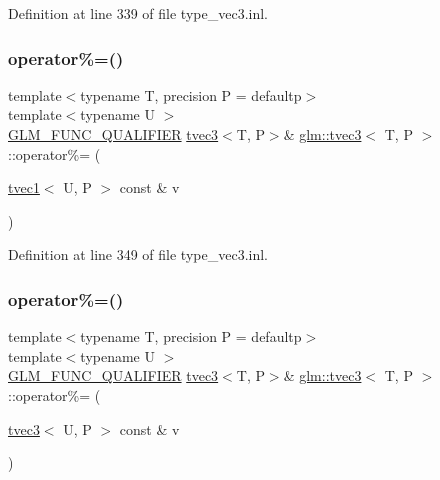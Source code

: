Definition at line 339 of file type\+\_\+vec3.\+inl.

\mbox{\label{structglm_1_1tvec3_aea61db59d6e74810ebdd814c44d0c7d2}} 
\subsubsection{\texorpdfstring{operator\%=()}{operator\%=()}\hspace{0.1cm}{\footnotesize\ttfamily [5/6]}}
{\footnotesize\ttfamily template$<$typename T, precision P = defaultp$>$ \\
template$<$typename U $>$ \\
\mbox{\hyperlink{setup_8hpp_a33fdea6f91c5f834105f7415e2a64407}{G\+L\+M\+\_\+\+F\+U\+N\+C\+\_\+\+Q\+U\+A\+L\+I\+F\+I\+ER}} \mbox{\hyperlink{structglm_1_1tvec3}{tvec3}}$<$T, P$>$\& \mbox{\hyperlink{structglm_1_1tvec3}{glm\+::tvec3}}$<$ T, P $>$\+::operator\%= (\begin{DoxyParamCaption}\item[{\mbox{\hyperlink{structglm_1_1tvec1}{tvec1}}$<$ U, P $>$ const \&}]{v }\end{DoxyParamCaption})}



Definition at line 349 of file type\+\_\+vec3.\+inl.

\mbox{\label{structglm_1_1tvec3_a4a0e1e225a1525d06c194dec0e966b67}} 
\subsubsection{\texorpdfstring{operator\%=()}{operator\%=()}\hspace{0.1cm}{\footnotesize\ttfamily [6/6]}}
{\footnotesize\ttfamily template$<$typename T, precision P = defaultp$>$ \\
template$<$typename U $>$ \\
\mbox{\hyperlink{setup_8hpp_a33fdea6f91c5f834105f7415e2a64407}{G\+L\+M\+\_\+\+F\+U\+N\+C\+\_\+\+Q\+U\+A\+L\+I\+F\+I\+ER}} \mbox{\hyperlink{structglm_1_1tvec3}{tvec3}}$<$T, P$>$\& \mbox{\hyperlink{structglm_1_1tvec3}{glm\+::tvec3}}$<$ T, P $>$\+::operator\%= (\begin{DoxyParamCaption}\item[{\mbox{\hyperlink{structglm_1_1tvec3}{tvec3}}$<$ U, P $>$ const \&}]{v }\end{DoxyParamCaption})}




